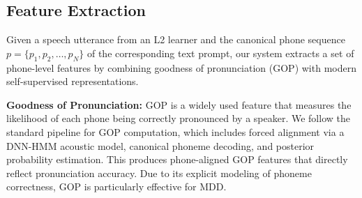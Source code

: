 \documentclass{Interspeech}
\begin{document}
\begin{table}[t]
\centering
\setlength{\tabcolsep}{2.5pt} %
\renewcommand{\arraystretch}{1} %
\caption{Experimental results of different methods evaluated on speechocean762.  refers to Accuracy and Completeness, respectively. }
\label{tab:main_results}
\end{table}
\subsection{Feature Extraction}
Given a speech utterance from an L2 learner and the canonical phone sequence $p = \{p_1, p_2, \ldots, p_N\}$ of the corresponding text prompt, our system extracts a set of phone-level features by combining goodness of pronunciation (GOP) \cite{witt2000phone, hu2015improved, shi2020context} with modern self-supervised representations. 

\textbf{Goodness of Pronunciation:}
GOP is a widely used feature that measures the likelihood of each phone being correctly pronounced by a speaker. We follow the standard pipeline for GOP computation, which includes forced alignment via a DNN-HMM acoustic model, canonical phoneme decoding, and posterior probability estimation. This produces phone-aligned GOP features that directly reflect pronunciation accuracy. Due to its explicit modeling of phoneme correctness, GOP is particularly effective for MDD.
\end{document}
